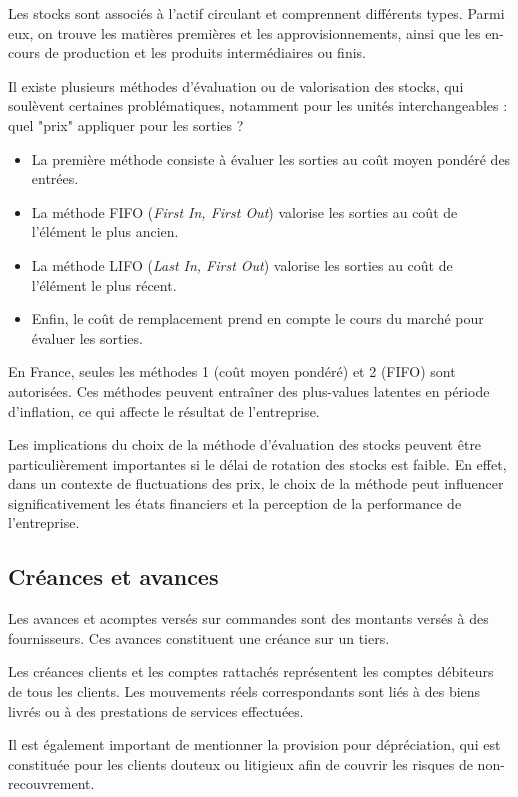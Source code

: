 \documentclass[a4paper, 12pt]{report}
\begin{document}
Les stocks sont associés à l'actif circulant et comprennent différents types. Parmi eux, on trouve les matières premières et les approvisionnements, ainsi que les en-cours de production et les produits intermédiaires ou finis.

Il existe plusieurs méthodes d'évaluation ou de valorisation des stocks, qui soulèvent certaines problématiques, notamment pour les unités interchangeables : quel "prix" appliquer pour les sorties ?

\begin{itemize}
	\item La première méthode consiste à évaluer les sorties au coût moyen pondéré des entrées.
	\item La méthode FIFO (\textit{First In, First Out}) valorise les sorties au coût de l'élément le plus ancien.
	\item La méthode LIFO (\textit{Last In, First Out}) valorise les sorties au coût de l'élément le plus récent.
	\item Enfin, le coût de remplacement prend en compte le cours du marché pour évaluer les sorties.
\end{itemize}

En France, seules les méthodes 1 (coût moyen pondéré) et 2 (FIFO) sont autorisées. Ces méthodes peuvent entraîner des plus-values latentes en période d'inflation, ce qui affecte le résultat de l'entreprise. 

Les implications du choix de la méthode d'évaluation des stocks peuvent être particulièrement importantes si le délai de rotation des stocks est faible. En effet, dans un contexte de fluctuations des prix, le choix de la méthode peut influencer significativement les états financiers et la perception de la performance de l'entreprise.

\subsection{Créances et avances}

Les avances et acomptes versés sur commandes sont des montants versés à des fournisseurs. Ces avances constituent une créance sur un tiers. 

Les créances clients et les comptes rattachés représentent les comptes débiteurs de tous les clients. Les mouvements réels correspondants sont liés à des biens livrés ou à des prestations de services effectuées. 

Il est également important de mentionner la provision pour dépréciation, qui est constituée pour les clients douteux ou litigieux afin de couvrir les risques de non-recouvrement.
\end{document}
